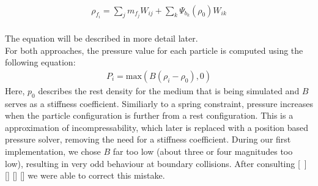 \documentclass{ACGSeminar}
\begin{document}
\\
\begin{equation} 
\begin{aligned}
\rho_{f_{i}} = \sum_{j}m_{f_{j}}W_{ij} + \sum_{k}\Psi_{b_{k}}(\rho_{0})W_{ik}
\end{aligned}
\end{equation}
\\
The equation will be described in more detail later.\\
For both approaches, the pressure value for each particle is computed using the following equation:\\
\begin{equation} 
\begin{aligned}
P_i = \text{max}(B(\rho_i - \rho_0),0)
\end{aligned}
\end{equation}
Here, \(p_0\) describes the rest density for the medium that is being simulated and \(B\) serves as a stiffness coefficient. Similiarly to a spring constraint, pressure increases when the particle configuration is further from a rest configuration. This is a approximation of incompressability, which later is replaced with a position based pressure solver, removing the need for a stiffness coefficient.
During our first implementation, we chose \(B\) far too low (about three or four magnitudes too low), resulting in very odd behaviour at boundary collisions. After consulting [~\cite{Becker}] [\cite{Liu}] [\cite{Akinci}] [\cite{Bridson2016}] we were able to correct this mistake.\\
\\
\end{document}
